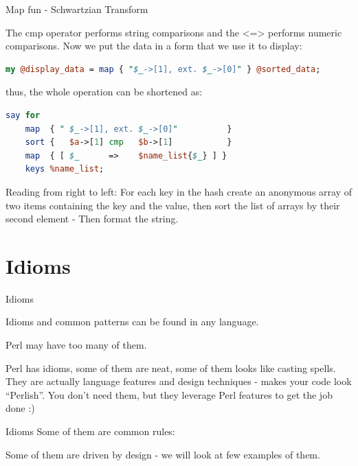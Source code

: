 \documentclass[10pt]{beamer}
\begin{document}
 \begin{frame}[fragile]{Map fun - Schwartzian Transform}

The cmp operator performs string comparisons and the <=> performs numeric comparisons. Now we put the data in a form that we use it to display:
\begin{lstlisting}[language=perl]
my @display_data = map { "$_->[1], ext. $_->[0]" } @sorted_data;
\end{lstlisting}
thus, the whole operation can be shortened as:
\begin{lstlisting}[language=perl]
say for
    map  { " $_->[1], ext. $_->[0]"          }
    sort {   $a->[1] cmp   $b->[1]           }
    map  { [ $_      =>    $name_list{$_} ] }
    keys %name_list;
\end{lstlisting}

Reading from right to left: For each key in the hash create an anonymous array of two items containing the key and the value, then sort the list of arrays by their second element - Then format the string.
\pause
{}

\end{frame}


\section{Idioms}
\begin{frame}[fragile]{Idioms}

Idioms and common patterns can be found in any language.
\item
Perl may have too many of them.

Perl has idioms, some of them are neat, some of them looks like casting spells. They are actually language features and design techniques - makes your code look ``Perlish''.
 You don't need them, but they leverage Perl features to get the job done  :)

\end{frame}

\begin{frame}[fragile]{Idioms}
Some of them are common rules:


Some of them are driven by design - we will look at few examples of them.
\end{frame}
\end{document}
